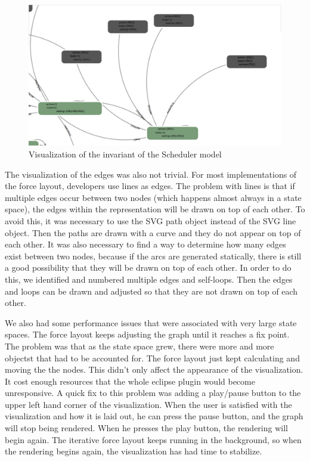 \begin{figure}[h!]
\centering
\includegraphics[width=15cm]{bilder/ss-neighborhood.png}
\caption{Visualization of the invariant of the Scheduler model}
\label{neighborhood}
\end{figure}

The visualization of the edges was also not trivial. For most implementations of the force layout, developers use lines as edges. The problem with lines is that if multiple edges occur between two nodes (which happens almost always in a state space), the edges within the representation will be drawn on top of each other. To avoid this, it was necessary to use the SVG path object instead of the SVG line object. Then the paths are drawn with a curve and they do not appear on top of each other. It was also necessary to find a way to determine how many edges exist between two nodes, because if the arcs are generated statically, there is still a good possibility that they will be drawn on top of each other. In order to do this, we identified and numbered multiple edges and self-loops. Then the edges and loops can be drawn and adjusted so that they are not drawn on top of each other.

We also had some performance issues that were associated with very large state spaces. The force layout keeps adjusting the graph until it reaches a fix point. The problem was that as the state space grew, there were more and more objectst that had to be accounted for. The force layout just kept calculating and moving the the nodes. This didn't only affect the appearance of the visualization. It cost enough resources that the whole eclipse plugin would become unresponsive. A quick fix to this problem was adding a play/pause button to the upper left hand corner of the visualization. When the user is satisfied with the visualization and how it is laid out, he can press the pause button, and the graph will stop being rendered. When he presses the play button, the rendering will begin again. The iterative force layout keeps running in the background, so when the rendering begins again, the visualization has had time to stabilize.

